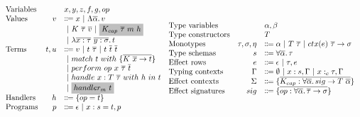 \documentclass[acmsmall]{acmart}
\newcommand{\graybox}[1]{\colorbox{lightgray}{$\displaystyle #1$}}
\newcommand{\vor}{~|~}
\newcommand{\ap}{~}
\newcommand{\ctx}[1]{ctx(#1)~}
\begin{document}
\begin{figure}
    \centering
    \begin{gather*}
        \begin{array}{lrll}
            \text{Variables} & & x, y, z, f, g, op \\
            \text{Values} &v &\Coloneqq x \vor \Lambda \overline{\alpha} \ldotp v \\
            &&\vor K\ap \overline{\tau} \ap \overline{v} \vor \graybox{K_{cap}\ap\overline{\tau}\ap m\ap h} \\
            &&\vor \lambda \overline{x : \tau}~\overline{y : \sigma}\ldotp t
            \\
            \text{Terms} &t, u &\Coloneqq v \vor t\ap\overline{\tau} \vor t \ap \overline{t} \ap \overline{t} \\
            &&\vor match ~ t ~ with ~\{\overline{K \ap \overline{x} \to t}\} \\
            &&\vor perform ~ op \ap x \ap \overline{\tau} \ap \overline{t} \\
            &&\vor handle ~ x : T \ap \overline{\tau} ~with ~h~in ~t \\
            &&\vor \graybox{handler_m ~ t}
            \\
            \text{Handlers} &h &\Coloneqq \{ \overline{op = t} \}
            \\
            \text{Programs} &p &\Coloneqq \epsilon \vor x : s = t, p
        \end{array}
        \begin{array}{lrl}
            \text{Type variables} && \alpha, \beta \\
            \text{Type constructors} && T \\
            \text{Monotypes} & \tau, \sigma, \eta &\Coloneqq \alpha \vor T \ap \overline{\tau} \vor \ctx{e} \overline{\tau} \to \sigma \\
            \text{Type schemas} & s &\Coloneqq \forall\overline{\alpha}\ldotp \tau \\
            \text{Effect rows} & e &\Coloneqq \epsilon\vor \tau, e \\
            \text{Typing contexts} & \Gamma &\Coloneqq \emptyset \vor x : s, \Gamma \vor x :_c \tau, \Gamma \\
            \text{Effect contexts} & \Sigma &\Coloneqq \{\overline{K_{cap} : \forall\overline{\alpha}\ldotp sig\to T\ap\overline{\alpha}}\} \\
            \text{Effect signatures} & sig &\Coloneqq \{\overline{op : \forall\overline{\alpha}\ldotp\overline{\tau}\to\sigma}\} \\

\end{array}
\end{gather*}
\end{figure}
\end{document}
